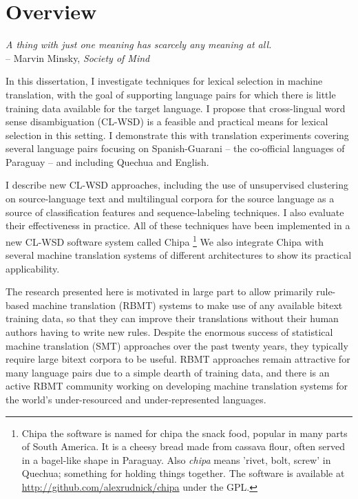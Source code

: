 \chapter{Overview}

\begin{centering}
\emph{A thing with just one meaning has scarcely any meaning at
all.} \\
-- Marvin Minsky, \emph{Society of Mind} \cite{minsky1988society} \\
\end{centering}
\bigskip

In this dissertation, I investigate techniques for lexical selection in
machine translation, with the goal of supporting language pairs for which 
there is little training data available for the target language. I propose
that cross-lingual word sense disambiguation (CL-WSD) is a feasible and
practical means for lexical selection in this setting. I demonstrate
this with translation experiments covering several language pairs focusing on
Spanish-Guarani -- the co-official languages of Paraguay -- and including
Quechua and English.

I describe new CL-WSD approaches, including the use of unsupervised
clustering on source-language text and multilingual corpora for the source
language as a source of classification features and sequence-labeling
techniques. I also evaluate their effectiveness in practice. All of these
techniques have been implemented in a new CL-WSD software system called Chipa
\footnote{Chipa the software is named for chipa the snack food, popular in many
  parts of South America. It is a cheesy bread made from cassava flour, often
  served in a bagel-like shape in Paraguay.  Also \emph{chipa} means 'rivet,
  bolt, screw' in Quechua; something for holding things together.  The software
is available at \\ \url{http://github.com/alexrudnick/chipa} under the GPL.}
We also integrate Chipa with several machine translation systems of different
architectures to show its practical applicability.

The research presented here is motivated in large part to allow primarily
rule-based machine translation (RBMT) systems to make use of any available
bitext training data, so that they can improve their translations without their
human authors having to write new rules.  Despite the enormous
success of statistical machine translation (SMT) approaches over the past
twenty years, they typically require large bitext corpora to be useful. RBMT
approaches remain attractive for many language pairs due to a simple dearth of
training data, and there is an active RBMT community working on developing
machine translation systems for the world's under-resourced and
under-represented languages.

